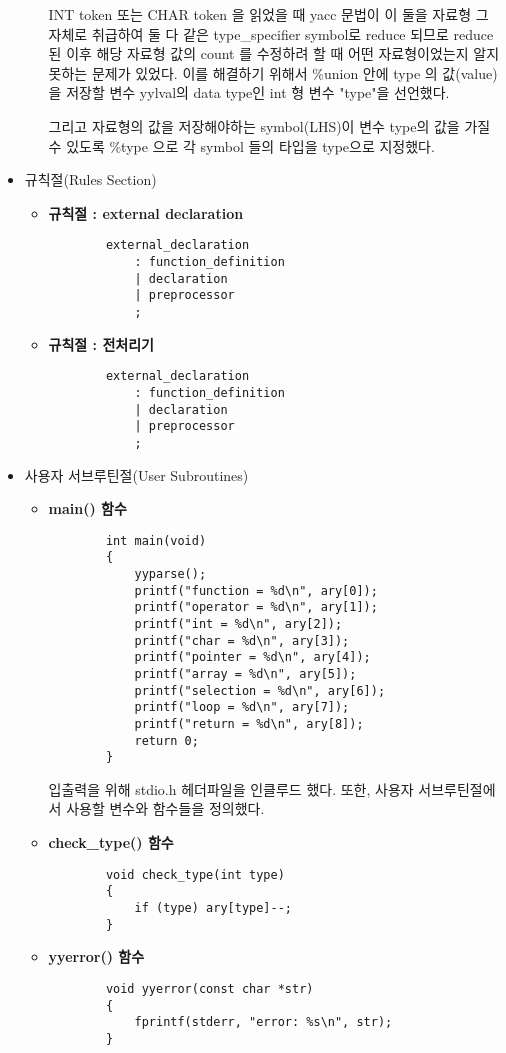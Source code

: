 \documentclass{article}
\begin{document}
\begin{itemize}
\begin{itemize}
		\vspace{3mm}
		INT token 또는 CHAR token 을 읽었을 때 yacc 문법이 이 둘을 자료형 그 자체로 취급하여
		둘 다 같은 type\_specifier symbol로 reduce 되므로 reduce 된 이후 해당 자료형 값의 count 를 수정하려 할 때
		어떤 자료형이었는지 알지 못하는 문제가 있었다. 이를 해결하기 위해서 \%union 안에 type 의 값(value)을 저장할
		변수 yylval의 data type인 int 형 변수 "type"을 선언했다.

		\vspace{3mm}
		그리고 자료형의 값을 저장해야하는 symbol(LHS)이 변수 type의 값을 가질 수 있도록 \%type 으로 각 symbol 들의
		타입을 type으로 지정했다.
	\end{itemize}

	\item 규칙절(Rules Section)	
	\begin{itemize}
		\item {\bf 규칙절 : external declaration}
		\begin{lstlisting}
		external_declaration
			: function_definition
			| declaration
			| preprocessor
			;
		\end{lstlisting}

		\item {\bf 규칙절 : 전처리기}
		\begin{lstlisting}
		external_declaration
			: function_definition
			| declaration
			| preprocessor
			;
		\end{lstlisting}
	\end{itemize}

	\item 사용자 서브루틴절(User Subroutines)	
	\begin{itemize}
		\item {\bf main() 함수}
		\begin{lstlisting}
		int main(void)
		{
			yyparse();
			printf("function = %d\n", ary[0]);
			printf("operator = %d\n", ary[1]);
			printf("int = %d\n", ary[2]);
			printf("char = %d\n", ary[3]);
			printf("pointer = %d\n", ary[4]);
			printf("array = %d\n", ary[5]);
			printf("selection = %d\n", ary[6]);
			printf("loop = %d\n", ary[7]);
			printf("return = %d\n", ary[8]);
			return 0;
		}
		\end{lstlisting}
		입출력을 위해 stdio.h 헤더파일을 인클루드 했다.
		또한, 사용자 서브루틴절에서 사용할 변수와 함수들을 정의했다.
	
		\item {\bf check\_type() 함수}
		\begin{lstlisting}
		void check_type(int type)
		{
			if (type) ary[type]--;
		}
		\end{lstlisting}
		
		\item {\bf yyerror() 함수}
		\begin{lstlisting}
		void yyerror(const char *str)
		{
			fprintf(stderr, "error: %s\n", str);
		}
		\end{lstlisting}
	\end{itemize}
\end{itemize}
\end{document}
